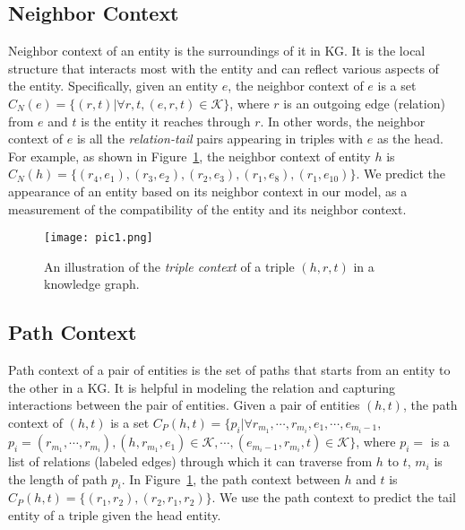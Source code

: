 \subsection{Neighbor Context}
Neighbor context of an entity is the surroundings of it in KG. It is the local structure that interacts most with the entity and can reflect various aspects of the entity. Specifically, given an entity $e$, the neighbor context of $e$ is a set $C_N(e)=\{(r,t)|\forall r, t, (e,r,t)\in\mathcal{K}\}$, where $r$ is an outgoing edge (relation) from $e$ and $t$ is the entity it reaches through $r$. In other words, the neighbor context of $e$ is all the \textit{relation-tail} pairs appearing in triples with $e$ as the head. For example, as shown in Figure~\ref{pic1}, the neighbor context of entity $h$ is $C_N(h)=\{(r_4, e_1), (r_3, e_2), (r_2, e_3), (r_1, e_8), (r_1, e_{10})\}$. We predict the appearance of an entity based on its neighbor context in our model, as a measurement of the compatibility of the entity and its neighbor context.

\begin{figure}
  \texttt{[image: pic1.png]}
  \caption{An illustration of the \emph{triple context} of a triple $(h,r,t)$ in a knowledge graph.}
  \label{pic1}
\end{figure}


\subsection{Path Context}
Path context of a pair of entities is the set of paths that starts from an entity to the other in a KG. It is helpful in modeling the relation and capturing interactions between the pair of entities. Given a pair of entities $(h,t)$, the path context of $(h,t)$ is a set $C_P(h,t)=\{p_i | \forall r_{m_1}, \cdots, r_{m_i}, e_1, \cdots, e_{m_i-1},$ $p_i=(r_{m_1}, \cdots, r_{m_i}), (h,r_{m_1},e_1)\in\mathcal{K}, \cdots, (e_{m_i-1}, r_{m_i}, t)\in\mathcal{K}\}$, where $p_i=$ is a list of relations (labeled edges) through which it can traverse from $h$ to $t$, $m_i$ is the length of path $p_i$. In Figure~\ref{pic1}, the path context between $h$ and $t$ is $C_P(h,t) = \{(r_1, r_2), (r_2, r_1, r_2)\}$. We use the path context to predict the tail entity of a triple given the head entity.


